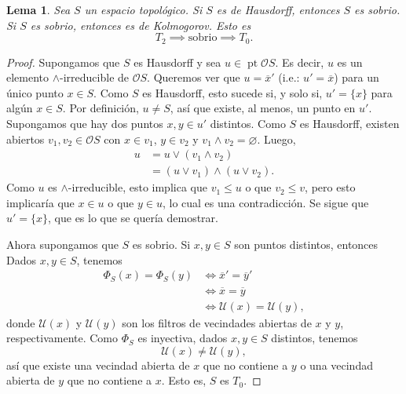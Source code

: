 \documentclass[12pt,letterpaper,titlepage]{article}
\let\emptyset\varnothing
\newtheorem{lemma}{Lema}
\theoremstyle{definition}
\renewcommand\sup{\vee}
\newcommand\ol[1]{\overline{#1}}
\renewcommand\inf{\wedge}
\renewcommand\cal[1]{\mathcal{#1}}
\newcommand\<{\langle}
\renewcommand\>{\rangle}
\DeclareMathOperator{\pt}{pt}
\begin{document}
\begin{lemma}
    Sea $S$ un espacio topológico.
    Si $S$ es de Hausdorff, entonces $S$ es sobrio.
    Si $S$ es sobrio, entonces es de Kolmogorov.
    Esto es
    \[
        T_2 \implies \text{sobrio}\implies T_0.
    \]
\end{lemma}
\begin{proof}
    Supongamos que $S$ es Hausdorff y sea $u\in\pt\cal OS$.
    Es decir, $u$ es un elemento $\inf$-irreducible de $\cal OS$.
    Queremos ver que $u=\ol{x}'$ (i.e.: $u'=\ol x$) para un único
    punto $x\in S$.
    Como $S$ es Hausdorff, esto sucede si, y solo si, $u'=\{x\}$
    para algún $x\in S$.
    Por definición, $u\neq S$, así que existe,
    al menos, un punto en $u'$.
    Supongamos que hay dos puntos $x,y\in u'$ distintos.
    Como $S$ es Hausdorff, existen abiertos $v_1,v_2\in\cal OS$
    con $x\in v_1$, $y\in v_2$ y $v_1\inf v_2=\emptyset$.
    Luego,
    \begin{align*}
        u
        &= u\sup(v_1\inf v_2) \\
        &= (u\sup v_1)\inf (u\sup v_2).
    \end{align*}
    Como $u$ es $\inf$-irreducible, esto implica que $v_1\leq u$
    o que $v_2\leq v$, pero esto implicaría que $x\in u$ o que $y\in u$,
    lo cual es una contradicción.
    Se sigue que $u'=\{x\}$, que es lo que se quería demostrar.
    
    Ahora supongamos que $S$ es sobrio.
    Si $x,y\in S$ son puntos distintos, entonces
    Dados $x,y\in S$, tenemos
    \begin{align*}
        \Phi_S(x) = \Phi_S(y)
        &\iff \ol{x}' = \ol{y}' \\
        &\iff \ol x = \ol y \\
        &\iff \cal U(x) = \cal U(y),
    \end{align*}
    donde $\cal U(x)$ y $\cal U(y)$ son los filtros
    de vecindades abiertas de $x$ y $y$, respectivamente.
    Como $\Phi_S$ es inyectiva, dados $x,y\in S$ distintos, tenemos
    \[
        \cal U(x)\neq\cal U(y),
    \]
    así que existe una vecindad abierta de $x$ que no contiene a $y$
    o una vecindad abierta de $y$ que no contiene a $x$.
    Esto es, $S$ es $T_0$.
\end{proof}
\end{document}
